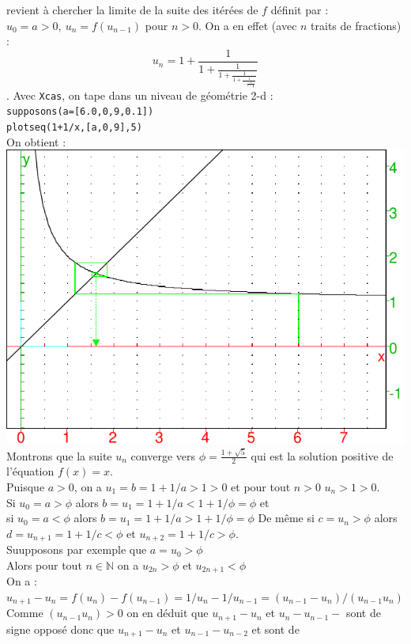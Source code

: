 \documentclass[a4paper,11pt]{book}
\newcommand{\N}{{\mathbb{N}}}
\begin{document}
\begin{enumerate}
revient \`a chercher la limite de la suite des it\'er\'ees de $f$ d\'efinit 
par : $u_0=a>0,\ u_n=f(u_{n-1})$ pour $n>0$.
On a en effet (avec $n$ traits de fractions) :
$$u_n=1+\frac{1}{1+\displaystyle\frac{1}{1+\displaystyle\frac{1}{1+\displaystyle\frac{1}{...\frac{1}{1+\displaystyle\frac{1}{a}}}}}}$$.
Avec {\tt Xcas}, on tape dans un niveau de g\'eom\'etrie 2-d :\\
{\tt supposons(a=[6.0,0,9,0.1])}\\
{\tt plotseq(1+1/x,[a,0,9],5)}\\ 
On obtient :\\
\includegraphics[width=\textwidth]{fiboniter}
Montrons que la suite $u_n$ converge vers 
$\phi=\frac{1+\sqrt5}{2}$ qui est la 
solution positive de l'\'equation $f(x)=x$.\\
Puisque $a>0$, on a $u_1=b=1+1/a>1>0$ et pour tout $n>0$ $u_n>1>0$.\\
Si $u_0=a>\phi$ alors $b=u_1=1+1/a<1+1/\phi=\phi$ et \\
si $u_0=a<\phi$ alors $b=u_1=1+1/a>1+1/\phi=\phi$
De m\^eme si $c=u_n>\phi$ alors $d=u_{n+1}=1+1/c<\phi$ et $u_{n+2}=1+1/c>\phi$.\\
Suupposons par exemple que $a=u_0>\phi$ \\ 
Alors pour tout $n\in \N$ on a $u_{2n}>\phi$ et $u_{2n+1}<\phi$\\
On a :\\
$u_{n+1}-u_n=f(u_n)-f(u_{n-1})=1/u_n-1/u_{n-1}=(u_{n-1}-u_n)/(u_{n-1}u_n)$\\
Comme $(u_{n-1}u_n)>0$ on en d\'eduit que $u_{n+1}-u_n$ et $u_n-u_{n-1}-$
sont de signe oppos\'e donc que $u_{n+1}-u_n$ et $u_{n-1}-u_{n-2}$ et  sont de 

\end{enumerate}
\end{document}
